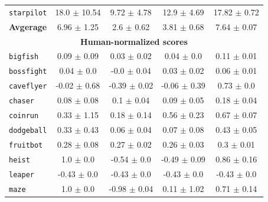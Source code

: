 \documentclass{article}
\begin{document}
\begin{table}[h]
\begin{tabular}{@{} l c c c c@{}}
    \texttt{starpilot}  &                 18.0 $\pm$ 10.54 &                   9.72 $\pm$ 4.78 &                   12.9 $\pm$ 4.69 &           17.82 $\pm$ 0.72 \\
    \textbf{Avgerage} &                  6.96 $\pm$ 1.25 &                    2.6 $\pm$ 0.62 &                   3.81 $\pm$ 0.68 &            7.64 $\pm$ 0.07 \\
    \midrule
    \multicolumn{5}{c}{\textbf{Human-normalized scores}} \\
    \texttt{bigfish}             &                  0.09 $\pm$ 0.09 &                   0.03 $\pm$ 0.02 &                    0.04 $\pm$ 0.0 &            0.11 $\pm$ 0.01 \\
    \texttt{bossfight}           &                   0.04 $\pm$ 0.0 &                   -0.0 $\pm$ 0.04 &                   0.03 $\pm$ 0.02 &            0.06 $\pm$ 0.01 \\
    \texttt{caveflyer}           &                 -0.02 $\pm$ 0.68 &                  -0.39 $\pm$ 0.02 &                  -0.06 $\pm$ 0.39 &             0.73 $\pm$ 0.0 \\
    \texttt{chaser}              &                  0.08 $\pm$ 0.08 &                    0.1 $\pm$ 0.04 &                   0.09 $\pm$ 0.05 &            0.18 $\pm$ 0.04 \\
    \texttt{coinrun}             &                  0.33 $\pm$ 1.15 &                   0.18 $\pm$ 0.14 &                   0.56 $\pm$ 0.23 &            0.67 $\pm$ 0.07 \\
    \texttt{dodgeball}           &                  0.33 $\pm$ 0.43 &                   0.06 $\pm$ 0.04 &                   0.07 $\pm$ 0.08 &            0.43 $\pm$ 0.05 \\
    \texttt{fruitbot}            &                  0.28 $\pm$ 0.08 &                   0.27 $\pm$ 0.02 &                   0.26 $\pm$ 0.03 &             0.3 $\pm$ 0.01 \\
    \texttt{heist}               &                    1.0 $\pm$ 0.0 &                   -0.54 $\pm$ 0.0 &                  -0.49 $\pm$ 0.09 &            0.86 $\pm$ 0.16 \\
    \texttt{leaper}              &                  -0.43 $\pm$ 0.0 &                   -0.43 $\pm$ 0.0 &                   -0.43 $\pm$ 0.0 &            -0.43 $\pm$ 0.0 \\
    \texttt{maze}                &                    1.0 $\pm$ 0.0 &                  -0.98 $\pm$ 0.04 &                   0.11 $\pm$ 1.02 &            0.71 $\pm$ 0.14 \\

\end{tabular}
\end{table}
\end{document}
